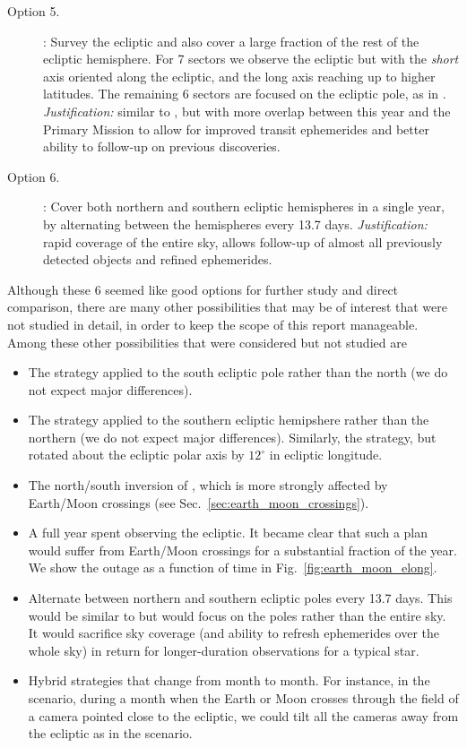 \begin{description}
\item[Option 5.] \eshort: Survey the ecliptic and also cover a large
  fraction of the rest of the ecliptic hemisphere. For 7 sectors we
  observe the ecliptic but with the {\it short} axis oriented along
  the ecliptic, and the long axis reaching up to higher latitudes.
  The remaining 6 sectors are focused on the ecliptic pole, as in
  \elong.  \textit{Justification:} similar to \elong, but with more
  overlap between this year and the Primary Mission to allow for
  improved transit ephemerides and better ability to follow-up on
  previous discoveries.
  
\item[Option 6.] \hemis: Cover both northern and southern ecliptic
  hemispheres in a single year, by alternating between the hemispheres
  every 13.7 days.  \textit{Justification:} rapid coverage of the
  entire sky, allows follow-up of almost all previously detected \tess
  objects and refined ephemerides.

\end{description}

Although these 6 seemed like good options for further study and direct
comparison, there are many other possibilities that may be of interest
that were not studied in detail, in order to keep the scope of this
report manageable.  Among these other possibilities that were considered but not studied are
\begin{itemize}
	\item The \npole\:strategy applied to the south ecliptic pole rather than the north (we do not expect major differences).
	\item The \nhemi\:strategy applied to the southern ecliptic hemipshere rather than the northern (we do not expect major differences).
	Similarly, the \nhemi\:strategy, but rotated about the ecliptic polar axis by
	$12^\circ$ in ecliptic longitude.
	\item The north/south inversion of \shemiAvoid, which is more strongly affected by Earth/Moon crossings (see Sec.~\ref{sec:earth_moon_crossings}).
	\item A full year spent observing the ecliptic.  It became clear that such a plan would suffer from Earth/Moon crossings for a substantial fraction of the year.
	We show the outage as a function of time in Fig.~\ref{fig:earth_moon_elong}.
        \item Alternate between northern and southern ecliptic poles every 13.7 days.
        This would be similar to \hemis\:but would focus on the poles rather than the entire sky.
        It would sacrifice sky coverage (and ability to refresh ephemerides over the whole sky) in return for longer-duration observations for a typical star.
        \item Hybrid strategies that change from month to month.  For instance, in the \nhemi\:scenario, during a month when the Earth or Moon crosses through the field of a camera pointed close to the ecliptic, we could tilt all the cameras away from the ecliptic as in the \npole\:scenario.        
\end{itemize}
